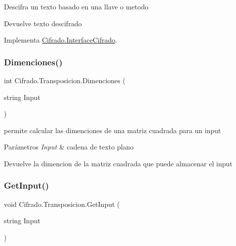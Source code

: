 Descifra un texto basado en una llave o metodo 

\begin{DoxyReturn}{Devuelve}
texto descifrado
\end{DoxyReturn}


Implementa \hyperlink{interface_cifrado_1_1_interface_cifrado_aef07884028ee90698a4a1202d851fecf}{Cifrado.\+Interface\+Cifrado}.

\mbox{\label{class_cifrado_1_1_transposicion_a8df16c3d60a6f57d8cf40b17a5f40925}} 
\subsubsection{\texorpdfstring{Dimenciones()}{Dimenciones()}}
{\footnotesize\ttfamily int Cifrado.\+Transposicion.\+Dimenciones (\begin{DoxyParamCaption}\item[{string}]{Input }\end{DoxyParamCaption})}



permite calcular las dimenciones de una matriz cuadrada para un input 


\begin{DoxyParams}{Parámetros}
{\em Input} & cadena de texto plano\\
\hline
\end{DoxyParams}
\begin{DoxyReturn}{Devuelve}
la dimencion de la matriz cuadrada que puede almacenar el input
\end{DoxyReturn}
\mbox{\label{class_cifrado_1_1_transposicion_a41f7391ffcd850e2aebf9852248d6d8d}} 
\subsubsection{\texorpdfstring{Get\+Input()}{GetInput()}}
{\footnotesize\ttfamily void Cifrado.\+Transposicion.\+Get\+Input (\begin{DoxyParamCaption}\item[{string}]{Input }\end{DoxyParamCaption})}



